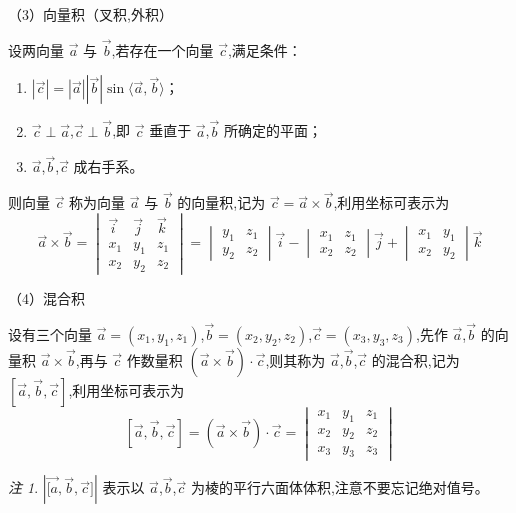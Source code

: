 \documentclass[UTF8]{ctexart}
\theoremstyle{remark}
\newtheorem{remark}{注}
\begin{document}
			（3）向量积（叉积,外积）
			
			设两向量 \(\vec{a}\) 与 \(\vec{b}\),若存在一个向量 \(\vec{c}\),满足条件：
			\begin{enumerate}
				\item \(|\vec{c}|=|\vec{a}||\vec{b}|\sin\langle\vec{a},\vec{b}\rangle\)；
				\item \(\vec{c}\perp\vec{a}\),\(\vec{c}\perp\vec{b}\),即 \(\vec{c}\) 垂直于 \(\vec{a}\),\(\vec{b}\) 所确定的平面；
				\item \(\vec{a}\),\(\vec{b}\),\(\vec{c}\) 成右手系。
			\end{enumerate}
			则向量 \(\vec{c}\) 称为向量 \(\vec{a}\) 与 \(\vec{b}\) 的向量积,记为 \(\vec{c}=\vec{a}\times\vec{b}\),利用坐标可表示为
			\[
			\vec{a}\times\vec{b}=
			\begin{vmatrix}
				\vec{i} & \vec{j} & \vec{k}\\
				x_1 & y_1 & z_1\\
				x_2 & y_2 & z_2
			\end{vmatrix}
			=
			\begin{vmatrix}
				y_1 & z_1\\
				y_2 & z_2
			\end{vmatrix}\vec{i}-
			\begin{vmatrix}
				x_1 & z_1\\
				x_2 & z_2
			\end{vmatrix}\vec{j}+
			\begin{vmatrix}
				x_1 & y_1\\
				x_2 & y_2
			\end{vmatrix}\vec{k}
			\]
			
			（4）混合积
			
			设有三个向量 \(\vec{a}=(x_1,y_1,z_1)\),\(\vec{b}=(x_2,y_2,z_2)\),\(\vec{c}=(x_3,y_3,z_3)\),先作 \(\vec{a}\),\(\vec{b}\) 的向量积 \(\vec{a}\times\vec{b}\),再与 \(\vec{c}\) 作数量积 \((\vec{a}\times\vec{b})\cdot\vec{c}\),则其称为 \(\vec{a}\),\(\vec{b}\),\(\vec{c}\) 的混合积,记为 \([\vec{a},\vec{b},\vec{c}]\),利用坐标可表示为
			\[
			[\vec{a},\vec{b},\vec{c}]=(\vec{a}\times\vec{b})\cdot\vec{c}=
			\begin{vmatrix}
				x_1 & y_1 & z_1\\
				x_2 & y_2 & z_2\\
				x_3 & y_3 & z_3
			\end{vmatrix}
			\]
			\begin{remark}
				\(|\vec{[a},\vec{b},\vec{c}]|\) 表示以 \(\vec{a}\),\(\vec{b}\),\(\vec{c}\) 为棱的平行六面体体积,注意不要忘记绝对值号。
			\end{remark}
			
\end{document}
